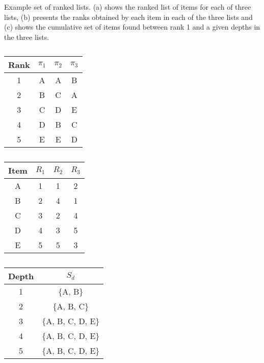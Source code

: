 \documentclass[12pt,a4paper]{article}\usepackage[]{graphicx}\usepackage[]{color}
\begin{document}
\begin{table}[tb]
  \caption{Example set of ranked lists. (a) shows the ranked list of items for each of three lists, (b) presents the ranks obtained by each item in each of the three lists and (c) shows the cumulative set of items found between rank 1 and a given depths in the three lists.}
\begin{center}
  \begin{subtable}{4cm}%
    \caption{}
      \begin{tabular}{cccc}
        \hline\hline %
        Rank & $\pi_1$ & $\pi_2$ & $\pi_3$ \\ \hline
        1 & A & A & B \\
        2 & B & C & A \\
        3 & C & D & E \\
        4 & D & B & C \\
        5 & E & E & D \\ \hline
    \end{tabular}
  \end{subtable}
\hspace{1em}
  \begin{subtable}{4cm}%
    \caption{}
    \begin{tabular}{cccc} \hline\hline
    Item & $R_1$ & $R_2$ & $R_3$ \\ \hline
    A & 1 & 1 & 2 \\
    B & 2 & 4 & 1 \\
    C & 3 & 2 & 4 \\
    D & 4 & 3 & 5 \\
    E & 5 & 5 & 3 \\ \hline
  \end{tabular}
\end{subtable}
\hspace{1em}
\begin{subtable}{4cm}%
  \caption{}
\begin{tabular}{cc} \hline\hline
Depth  &  $S_d$ \\ \hline
1 & $\{$A, B$\}$\\
2 & $\{$A, B, C$\}$ \\
3 & $\{$A, B, C, D, E$\}$ \\
4 & $\{$A, B, C, D, E$\}$ \\
5 & $\{$A, B, C, D, E$\}$ \\ \hline
\end{tabular}
\end{subtable}
\end{center}
\label{tab:example}
\end{table}
\end{document}
